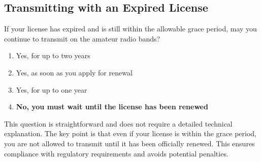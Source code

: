 \subsection{Transmitting with an Expired License}
\label{T1C11}

\begin{tcolorbox}[colback=gray!10!white,colframe=black!75!black,title=T1C11]
If your license has expired and is still within the allowable grace period, may you continue to transmit on the amateur radio bands?
\begin{enumerate}[label=\Alph*),noitemsep]
    \item Yes, for up to two years
    \item Yes, as soon as you apply for renewal
    \item Yes, for up to one year
    \item \textbf{No, you must wait until the license has been renewed}
\end{enumerate}
\end{tcolorbox}

This question is straightforward and does not require a detailed technical explanation. The key point is that even if your license is within the grace period, you are not allowed to transmit until it has been officially renewed. This ensures compliance with regulatory requirements and avoids potential penalties.